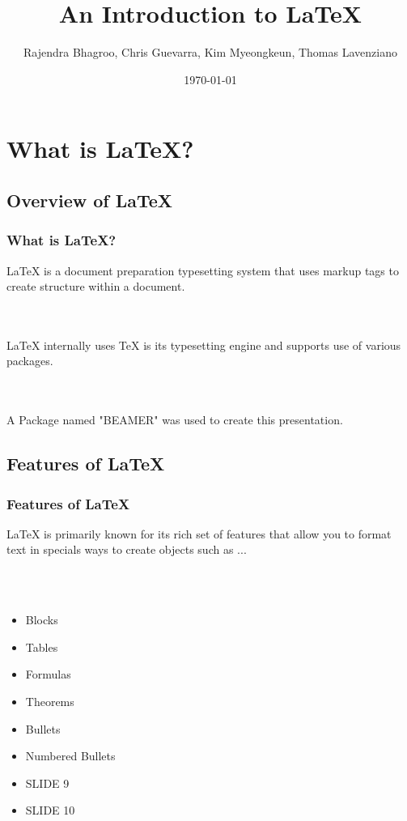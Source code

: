 \documentclass{beamer}
\title[LaTeX]{An Introduction to LaTeX}
\author[Programming Language Concepts - CSCI 318]{Rajendra Bhagroo, Chris Guevarra, Kim Myeongkeun, Thomas Lavenziano}
\institute[NYIT]
{
New York Institute of Technology \\
\medskip
}
\date{\today}
\begin{document}
\begin{frame}
\titlepage
\end{frame}


\section{What is LaTeX?}

\subsection{Overview of LaTeX}

\begin{frame}
\frametitle{What is LaTeX?}

LaTeX is a document preparation typesetting system that uses markup tags to create structure within a document.

\\~\\

LaTeX internally uses TeX is its typesetting engine and supports use of various packages. 

\\~\\

A Package named "BEAMER" was used to create this presentation.

\end{frame}


\subsection{Features of LaTeX}

\begin{frame}
\frametitle{Features of LaTeX}

LaTeX is primarily known for its rich set of features that allow you to format text in specials ways to create objects such as ...

\\~\\

\begin{itemize}
\item Blocks
\item Tables
\item Formulas
\item Theorems
\item Bullets
\item Numbered Bullets
\item SLIDE 9
\item SLIDE 10
\end{itemize}
\end{frame}
\end{document}

